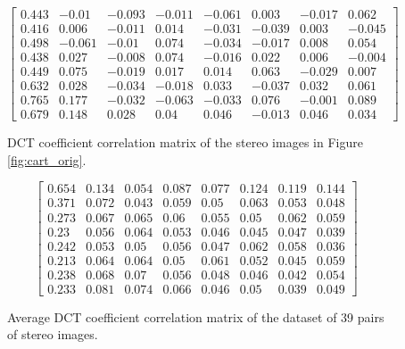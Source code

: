 \documentclass[10pt,twoside,titlepage]{article}
\begin{document}
\begin{figure}
    \begin{equation*}
        \left[
        \begin{matrix}
        0.443 & -0.01  & -0.093 & -0.011 & -0.061 &   0.003 & -0.017 &  0.062 \\
        0.416 &  0.006 & -0.011 &  0.014 & -0.031 &  -0.039 &  0.003 & -0.045 \\
        0.498 & -0.061 & -0.01  &  0.074 & -0.034 &  -0.017 &  0.008 &  0.054 \\
        0.438 &  0.027 & -0.008 &  0.074 & -0.016 &   0.022 &  0.006 & -0.004 \\
        0.449 &  0.075 & -0.019 &  0.017 &  0.014 &   0.063 & -0.029 &  0.007 \\
        0.632 &  0.028 & -0.034 & -0.018 &  0.033 &  -0.037 &  0.032 &  0.061 \\
        0.765 &  0.177 & -0.032 & -0.063 & -0.033 &   0.076 & -0.001 &  0.089 \\
        0.679 &  0.148 &  0.028 &  0.04  &  0.046 &  -0.013 &  0.046 &  0.034
        \end{matrix}
        \right]
    \end{equation*}
    \caption{DCT coefficient correlation matrix of the stereo images in Figure \ref{fig:cart_orig}.}
\end{figure}

\begin{figure}
    \begin{equation*}
        \left[
        \begin{matrix}
        0.654 & 0.134 & 0.054 & 0.087 & 0.077 & 0.124 & 0.119 & 0.144 \\
        0.371 & 0.072 & 0.043 & 0.059 & 0.05  & 0.063 & 0.053 & 0.048 \\
        0.273 & 0.067 & 0.065 & 0.06  & 0.055 & 0.05  & 0.062 & 0.059 \\
        0.23  & 0.056 & 0.064 & 0.053 & 0.046 & 0.045 & 0.047 & 0.039 \\
        0.242 & 0.053 & 0.05  & 0.056 & 0.047 & 0.062 & 0.058 & 0.036 \\
        0.213 & 0.064 & 0.064 & 0.05  & 0.061 & 0.052 & 0.045 & 0.059 \\
        0.238 & 0.068 & 0.07  & 0.056 & 0.048 & 0.046 & 0.042 & 0.054 \\
        0.233 & 0.081 & 0.074 & 0.066 & 0.046 & 0.05  & 0.039 & 0.049
        \end{matrix}
        \right]
    \end{equation*}
    \caption{Average DCT coefficient correlation matrix of the dataset of 39 pairs of stereo images.}
\end{figure}
\end{document}
